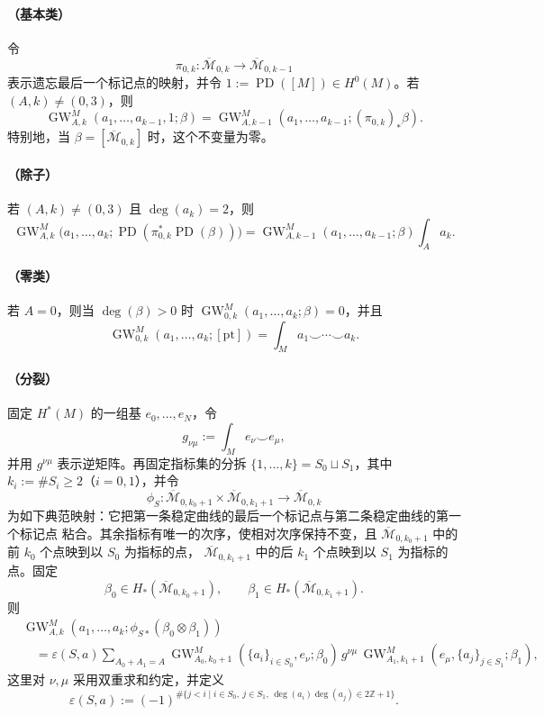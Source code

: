 \paragraph{（基本类）}
令
\[
  \pi_{0,k}:\overline{\mathcal M}_{0,k}
  \longrightarrow\overline{\mathcal M}_{0,k-1}
\]
表示遗忘最后一个标记点的映射，并令
$1:=\operatorname{PD}([M])\in H^0(M)$。若 $(A,k)\ne(0,3)$，则
\[
  \operatorname{GW}_{A,k}^M(a_1,\ldots,a_{k-1},1;\beta)
  =\operatorname{GW}_{A,k-1}^M
    (a_1,\ldots,a_{k-1};(\pi_{0,k})_*\beta).
\]
特别地，当 $\beta=[\overline{\mathcal M}_{0,k}]$ 时，这个不变量为零。

\paragraph{（除子）}
若 $(A,k)\ne(0,3)$ 且 $\deg(a_k)=2$，则
\[
  \operatorname{GW}_{A,k}^M
  \bigl(a_1,\ldots,a_k;
    \operatorname{PD}(\pi_{0,k}^*\operatorname{PD}(\beta))\bigr)
  =\operatorname{GW}_{A,k-1}^M(a_1,\ldots,a_{k-1};\beta)
    \int_Aa_k.
\]

\paragraph{（零类）}
若 $A=0$，则当 $\deg(\beta)>0$ 时
$\operatorname{GW}_{0,k}^M(a_1,\ldots,a_k;\beta)=0$，并且
\[
  \operatorname{GW}_{0,k}^M(a_1,\ldots,a_k;[\mathrm{pt}])
  =\int_Ma_1\smile\cdots\smile a_k.
\]

\paragraph{（分裂）}
固定 $H^*(M)$ 的一组基 $e_0,\ldots,e_N$，令
\[
  g_{\nu\mu}:=\int_Me_\nu\smile e_\mu,
\]
并用 $g^{\nu\mu}$ 表示逆矩阵。再固定指标集的分拆
$\{1,\ldots,k\}=S_0\sqcup S_1$，其中
$k_i:=\#S_i\ge2$（$i=0,1$），并令
\[
  \phi_S:\overline{\mathcal M}_{0,k_0+1}
  \times\overline{\mathcal M}_{0,k_1+1}
  \longrightarrow\overline{\mathcal M}_{0,k}
\]
为如下典范映射：它把第一条稳定曲线的最后一个标记点与第二条稳定曲线的第一个标记点
粘合。其余指标有唯一的次序，使相对次序保持不变，且
$\overline{\mathcal M}_{0,k_0+1}$ 中的前 $k_0$ 个点映到以 $S_0$ 为指标的点，
$\overline{\mathcal M}_{0,k_1+1}$ 中的后 $k_1$ 个点映到以 $S_1$ 为指标的点。固定
\[
  \beta_0\in H_*(\overline{\mathcal M}_{0,k_0+1}),\qquad
  \beta_1\in H_*(\overline{\mathcal M}_{0,k_1+1}).
\]
则
\begin{align*}
 &\operatorname{GW}_{A,k}^M
   (a_1,\ldots,a_k;\phi_{S*}(\beta_0\otimes\beta_1))\\
 &\quad=\varepsilon(S,a)
   \sum_{A_0+A_1=A}
   \operatorname{GW}_{A_0,k_0+1}^M
      (\{a_i\}_{i\in S_0},e_\nu;\beta_0)\,g^{\nu\mu}\,
   \operatorname{GW}_{A_1,k_1+1}^M
      (e_\mu,\{a_j\}_{j\in S_1};\beta_1),
\end{align*}
这里对 $\nu,\mu$ 采用双重求和约定，并定义
\[
  \varepsilon(S,a)
  :=(-1)^{\#\{j<i\mid i\in S_0,\ j\in S_1,\,
                  \deg(a_i)\deg(a_j)\in2\mathbb Z+1\}}.
\]

